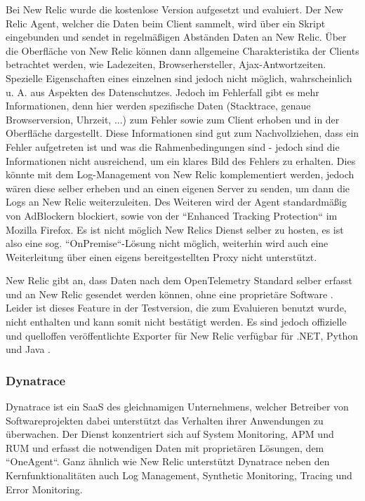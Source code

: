 
Bei New Relic wurde die kostenlose Version aufgesetzt und evaluiert. Der New Relic Agent, welcher die Daten beim Client sammelt, wird über ein Skript eingebunden und sendet in regelmäßigen Abständen Daten an New Relic. Über die Oberfläche von New Relic können dann allgemeine Charakteristika der Clients betrachtet werden, wie Ladezeiten, Browserhersteller, Ajax-Antwortzeiten. Spezielle Eigenschaften eines einzelnen sind jedoch nicht möglich, wahrscheinlich u. A. aus Aspekten des Datenschutzes. Jedoch im Fehlerfall gibt es mehr Informationen, denn hier werden spezifische Daten (Stacktrace, genaue Browserversion, Uhrzeit, ...) zum Fehler sowie zum Client erhoben und in der Oberfläche dargestellt. Diese Informationen sind gut zum Nachvollziehen, dass ein Fehler aufgetreten ist und was die Rahmenbedingungen sind - jedoch sind die Informationen nicht ausreichend, um ein klares Bild des Fehlers zu erhalten. Dies könnte mit dem Log-Management von New Relic komplementiert werden, jedoch wären diese selber erheben und an einen eigenen Server zu senden, um dann die Logs an New Relic weiterzuleiten. Des Weiteren wird der Agent standardmäßig von AdBlockern blockiert, sowie von der ``Enhanced Tracking Protection`` im Mozilla Firefox. Es ist nicht möglich New Relics Dienst selber zu hosten, es ist also eine sog. ``OnPremise``-Lösung nicht möglich, weiterhin wird auch eine Weiterleitung über einen eigens bereitgestellten Proxy nicht unterstützt.

New Relic gibt an, dass Daten nach dem OpenTelemetry Standard selber erfasst und an New Relic gesendet werden können, ohne eine proprietäre Software \cite{NewRelicAnnoundOTelBetaSupport}. Leider ist dieses Feature in der Testversion, die zum Evaluieren benutzt wurde, nicht enthalten und kann somit nicht bestätigt werden. Es sind jedoch offizielle und quelloffen veröffentlichte Exporter für New Relic verfügbar für .NET, Python und Java \cite{OpenTelemetryRegistry}.

\subsubsection{Dynatrace}

Dynatrace \cite{Dynatrace} ist ein SaaS des gleichnamigen Unternehmens, welcher Betreiber von Softwareprojekten dabei unterstützt das Verhalten ihrer Anwendungen zu überwachen. Der Dienst konzentriert sich auf System Monitoring, APM und RUM und erfasst die notwendigen Daten mit proprietären Lösungen, dem ``OneAgent``. Ganz ähnlich wie New Relic unterstützt Dynatrace neben den Kernfunktionalitäten auch Log Management, Synthetic Monitoring, Tracing und Error Monitoring.

